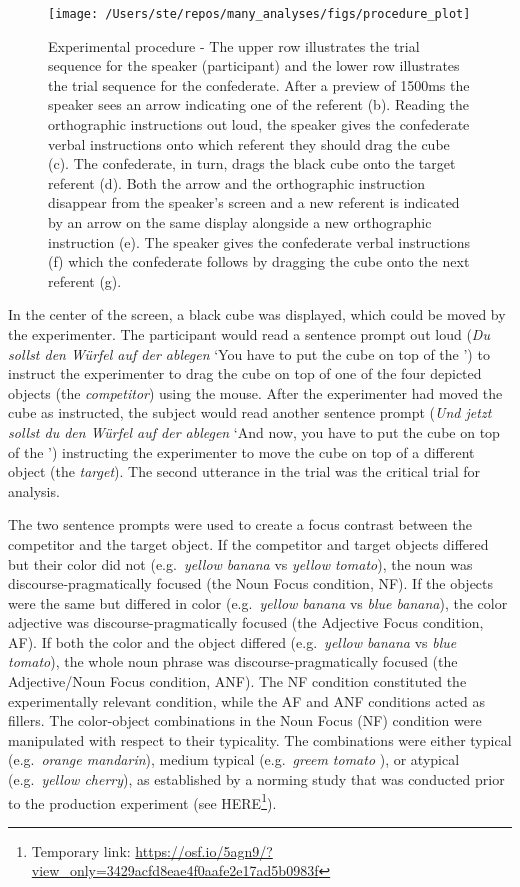 \documentclass[
  12pt,
]{article}
\begin{document}
\begin{figure}
\texttt{[image: /Users/ste/repos/many\_analyses/figs/procedure\_plot]} \caption{Experimental procedure - The upper row illustrates the trial sequence for the speaker (participant) and the lower row illustrates the trial sequence for the confederate. After a preview of 1500ms the speaker sees an arrow indicating one of the referent (b). Reading the orthographic instructions out loud, the speaker gives the confederate verbal instructions onto which referent they should drag the cube (c). The confederate, in turn, drags the black cube onto the target referent (d). Both the arrow and the orthographic instruction disappear from the speaker's screen and a new referent is indicated by an arrow on the same display alongside a new orthographic instruction (e). The speaker gives the confederate verbal instructions (f) which the confederate follows by dragging the cube onto the next referent (g).}\label{fig:procedural}
\end{figure}

In the center of the screen, a black cube was displayed, which could be moved by the experimenter.
The participant would read a sentence prompt out loud (\emph{Du sollst den Würfel auf der ablegen} `You have to put the cube on top of the ') to instruct the experimenter to drag the cube on top of one of the four depicted objects (the \emph{competitor}) using the mouse.
After the experimenter had moved the cube as instructed, the subject would read another sentence prompt (\emph{Und jetzt sollst du den Würfel auf der ablegen} `And now, you have to put the cube on top of the ') instructing the experimenter to move the cube on top of a different object (the \emph{target}).
The second utterance in the trial was the critical trial for analysis.

The two sentence prompts were used to create a focus contrast between the competitor and the target object.
If the competitor and target objects differed but their color did not (e.g.~\emph{yellow banana} vs \emph{yellow tomato}), the noun was discourse-pragmatically focused (the Noun Focus condition, NF).
If the objects were the same but differed in color (e.g.~\emph{yellow banana} vs \emph{blue banana}), the color adjective was discourse-pragmatically focused (the Adjective Focus condition, AF).
If both the color and the object differed (e.g.~\emph{yellow banana} vs \emph{blue tomato}), the whole noun phrase was discourse-pragmatically focused (the Adjective/Noun Focus condition, ANF).
The NF condition constituted the experimentally relevant condition, while the AF and ANF conditions acted as fillers.
The color-object combinations in the Noun Focus (NF) condition were manipulated with respect to their typicality.
The combinations were either typical (e.g.~\emph{orange mandarin}), medium typical (e.g.~\emph{greem tomato} ), or atypical (e.g.~\emph{yellow cherry}), as established by a norming study that was conducted prior to the production experiment (see HERE\footnote{Temporary link: \url{https://osf.io/5agn9/?view_only=3429acfd8eae4f0aafe2e17ad5b0983f}}).
\end{document}
